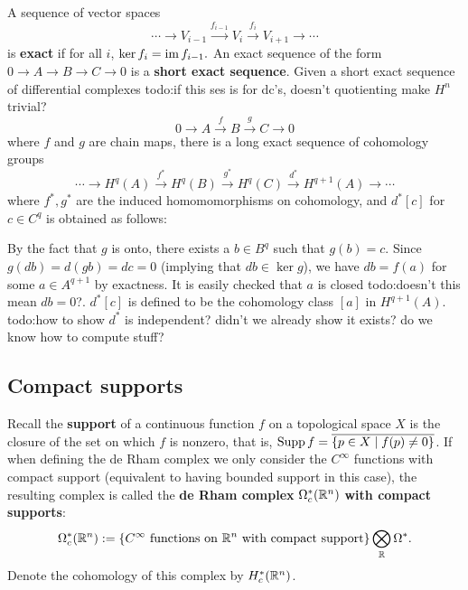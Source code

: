 A sequence of vector spaces \[
\cdots \longrightarrow V_{i-1}\overset{f_{i-1}}{\longrightarrow} V_i \overset{f_i }{\longrightarrow} V_{i+1}\longrightarrow\cdots 
\] is \textbf{exact} if for all $i$, $\ker f_i =\operatorname{im} f_{i-1}.$ An exact sequence of the form $0 \to A\to B\to C\to 0$ is a \textbf{short exact sequence}. Given a short exact sequence of differential complexes {\color{red}todo:if this ses is for dc's, doesn't quotienting make $H^n $ trivial?}  \[
0 \longrightarrow A \overset{f}{\longrightarrow } B \overset{g}{\longrightarrow } C\longrightarrow 0
\] where $f$ and $g$ are chain maps, there is a long exact sequence of cohomology groups \[
\cdots \to H^q(A) \overset{f^*}{\longrightarrow} H^q(B) \overset{g^*}{\longrightarrow} H^q(C) \overset{d^*}{\longrightarrow} H^{q+1}(A)\to \cdots 
\] where $f^*,g^*$ are the induced homomomorphisms on cohomology, and $d^*[c]$ for $c \in C^q$ is obtained as follows:
\begin{figure}[H]
\centering
{}
\end{figure}
By the fact that $g$ is onto, there exists a $b\in B^q$ such that $g(b)=c$. Since $g(db)=d(gb)=dc=0$ (implying that $db \in \ker g$), we have $db=f(a)$ for some $a \in A^{q+1}$ by exactness. It is easily checked that $a$ is closed {\color{red}todo:doesn't this mean $db=0$?}. $d^*[c]$ is defined to be the cohomology class $[a]$ in $H^{q+1}(A)$. {\color{red}todo:how to show $d^*$ is independent? didn't we already show it exists? do we know how to compute stuff?} 

\subsection{Compact supports}
Recall the \textbf{support} of a continuous function $f$ on a topological space $X$ is the closure of the set on which $f$ is nonzero, that is, $\operatorname{Supp} f= \overline{\{p \in X\mid f(p)\neq 0\} }$. If when defining the de Rham complex we only consider the $C^{\infty}$ functions with compact support (equivalent to having bounded support in this case), the resulting complex is called the \textbf{de Rham complex} $\Omega_c^*(\mathbb{R}^n )$ \textbf{with compact supports}: 
\[
    \Omega_c^*(\R^n ):= \{C^{\infty} \ \text{functions on} \ \R^n \ \text{with compact support}  \} \bigotimes _{\R}\Omega^*.
\] Denote the cohomology of this complex by $H_c^*(\mathbb{R}^n )$.

